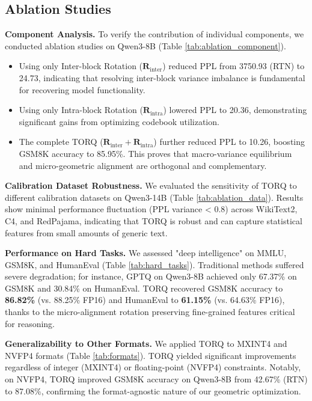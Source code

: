 

\subsection{Ablation Studies}

\textbf{Component Analysis.} To verify the contribution of individual components, we conducted ablation studies on Qwen3-8B (Table \ref{tab:ablation_component}). 
\begin{itemize}
    \item Using only Inter-block Rotation ($\mathbf{R}_{\text{inter}}$) reduced PPL from 3750.93 (RTN) to 24.73, indicating that resolving inter-block variance imbalance is fundamental for recovering model functionality.
    \item Using only Intra-block Rotation ($\mathbf{R}_{\text{intra}}$) lowered PPL to 20.36, demonstrating significant gains from optimizing codebook utilization.
    \item The complete TORQ ($\mathbf{R}_{\text{inter}} + \mathbf{R}_{\text{intra}}$) further reduced PPL to 10.26, boosting GSM8K accuracy to 85.95\%. This proves that macro-variance equilibrium and micro-geometric alignment are orthogonal and complementary.
\end{itemize}



\textbf{Calibration Dataset Robustness.} We evaluated the sensitivity of TORQ to different calibration datasets on Qwen3-14B (Table \ref{tab:ablation_data}). Results show minimal performance fluctuation (PPL variance < 0.8) across WikiText2, C4, and RedPajama, indicating that TORQ is robust and can capture statistical features from small amounts of generic text.



\textbf{Performance on Hard Tasks.} We assessed "deep intelligence" on MMLU, GSM8K, and HumanEval (Table \ref{tab:hard_tasks}). Traditional methods suffered severe degradation; for instance, GPTQ on Qwen3-8B achieved only 67.37\% on GSM8K and 30.84\% on HumanEval. TORQ recovered GSM8K accuracy to \textbf{86.82\%} (vs. 88.25\% FP16) and HumanEval to \textbf{61.15\%} (vs. 64.63\% FP16), thanks to the micro-alignment rotation preserving fine-grained features critical for reasoning.



\vspace{-3mm}

\textbf{Generalizability to Other Formats.} We applied TORQ to MXINT4 and NVFP4 formats (Table \ref{tab:formats}). TORQ yielded significant improvements regardless of integer (MXINT4) or floating-point (NVFP4) constraints. Notably, on NVFP4, TORQ improved GSM8K accuracy on Qwen3-8B from 42.67\% (RTN) to 87.08\%, confirming the format-agnostic nature of our geometric optimization.

